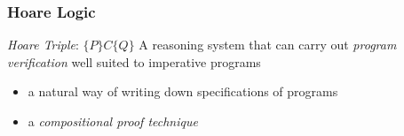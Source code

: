 \documentclass[xcolor=dvipsnames,9pt,hide notes,mathserif]{beamer}
\begin{document}














\begin{frame}
  \frametitle{Hoare Logic}
  \textit{Hoare Triple}: $\{P\} C \{Q\}$
  \vskip1cm
  A reasoning system that can carry out \textit{program verification}
  well suited to imperative programs
  \begin{itemize}
  \item a natural way of writing down specifications of programs
  \item a \textit{compositional proof technique}
  \end{itemize}
\end{frame}
\end{document}
